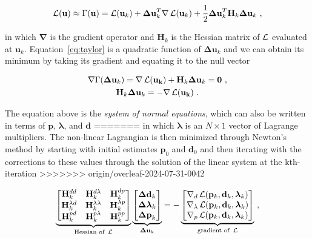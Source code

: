 \begin{equation}
  \operatorname{\mathcal{L}}(\mathbf{u}) \approx
  \Gamma(\mathbf{u}) =
  \operatorname{\mathcal{L}}(\mathbf{u}_k)
    + \mathbf{\Delta u}_k^T \mathbf{\nabla}\operatorname{\mathcal{L}}(\mathbf{u}_k)
    + \dfrac{1}{2}\mathbf{\Delta u}_k^T\mathbf{H}_k\mathbf{\Delta u}_k
  \ ,
  \label{eq:taylor}
\end{equation}

\noindent
in which $\mathbf{\nabla}$ is the gradient operator and $\mathbf{H}_k$ is the
Hessian matrix of $\operatorname{\mathcal{L}}$ evaluated at $\mathbf{u}_k$.
Equation~\ref{eq:taylor} is a quadratic function of $\mathbf{\Delta u}_k$ and
we can obtain its minimum by taking its gradient and equating it to the null
vector

\begin{equation}
  \begin{gathered}
    \mathbf{\nabla}\Gamma(\mathbf{\Delta u}_k) =
      \mathbf{\nabla}\operatorname{\mathcal{L}}(\mathbf{u_k})
      + \mathbf{H}_k\mathbf{\Delta u}_k
      = \mathbf{0}
    \ ,
    \\
    \mathbf{H}_k\mathbf{\Delta u}_k = -\mathbf{\nabla}\operatorname{\mathcal{L}}(\mathbf{u_k})
    \ .
  \end{gathered}
\end{equation}

\noindent
The equation above is the \textit{system of normal equations}, which can also
be written in terms of $\mathbf{p}$, $\boldsymbol{\lambda}$, and $\mathbf{d}$
=======
in which $\boldsymbol{\lambda}$ is an $N \times 1$ vector of Lagrange multipliers.
The non-linear Lagrangian is then minimized through Newton's method by starting
with initial estimates $\mathbf{p}_0$ and $\mathbf{d}_0$ and then iterating
with the corrections to these values through the solution of the linear system at the kth-iteration
\citep{Aster2018}
>>>>>>> origin/overleaf-2024-07-31-0042

\begin{equation}
  \underbrace{
    \begin{bmatrix}
      \mathbf{H}^{dd}_k & \mathbf{H}^{d\lambda}_k & \mathbf{H}^{dp}_k \\
      \mathbf{H}^{\lambda d}_k & \mathbf{H}^{\lambda\lambda}_k & \mathbf{H}^{\lambda p}_k \\
      \mathbf{H}^{pd}_k & \mathbf{H}^{p\lambda}_k & \mathbf{H}^{pp}_k
    \end{bmatrix}
  }_{\text{Hessian of }\operatorname{\mathcal{L}}}
  \underbrace{
    \begin{bmatrix}
      \mathbf{\Delta d}_k \\
      \boldsymbol{\Delta\lambda}_k \\
      \mathbf{\Delta p}_k
    \end{bmatrix}
  }_{\mathbf{\Delta u}_k}
  = -
  \underbrace{
    \begin{bmatrix}
      \mathbf{\nabla}_d\operatorname{\mathcal{L}}(\mathbf{p}_k,\mathbf{d}_k,\boldsymbol{\lambda}_k) \\
      \mathbf{\nabla}_\lambda\operatorname{\mathcal{L}}(\mathbf{p}_k,\mathbf{d}_k,\boldsymbol{\lambda}_k) \\
      \mathbf{\nabla}_p\operatorname{\mathcal{L}}(\mathbf{p}_k,\mathbf{d}_k,\boldsymbol{\lambda}_k)
    \end{bmatrix}
  }_{\text{gradient of }\operatorname{\mathcal{L}}}
  \ ,
\end{equation}


